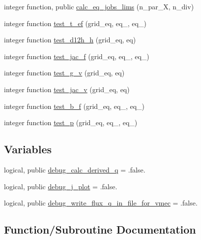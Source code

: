 \begin{DoxyCompactItemize}
\item 
integer function, public \hyperlink{namespaceeq__ops_a4e20b8725fce149449f83754244dc84e}{calc\+\_\+eq\+\_\+jobs\+\_\+lims} (n\+\_\+par\+\_\+X, n\+\_\+div)
\item 
integer function \hyperlink{namespaceeq__ops_a1f5049c3e309fa23ee46fd116c9344f1}{test\+\_\+t\+\_\+ef} (grid\+\_\+eq, eq\+\_, eq\+\_)
\item 
integer function \hyperlink{namespaceeq__ops_a003df1e1ab90dc6f586c3eed3dd067e8}{test\+\_\+d12h\+\_\+h} (grid\+\_\+eq, eq)
\item 
integer function \hyperlink{namespaceeq__ops_a05dcd4803b9c7845d3353614c9630c23}{test\+\_\+jac\+\_\+f} (grid\+\_\+eq, eq\+\_, eq\+\_)
\item 
integer function \hyperlink{namespaceeq__ops_a9811c83477d9d85f7401fd7957a590fc}{test\+\_\+g\+\_\+v} (grid\+\_\+eq, eq)
\item 
integer function \hyperlink{namespaceeq__ops_aef40d04e93f6a96576f8fe893fb086f8}{test\+\_\+jac\+\_\+v} (grid\+\_\+eq, eq)
\item 
integer function \hyperlink{namespaceeq__ops_a8082c12510696bd8ffdd0deef41860c2}{test\+\_\+b\+\_\+f} (grid\+\_\+eq, eq\+\_, eq\+\_)
\item 
integer function \hyperlink{namespaceeq__ops_a38b723f6ed5d2e2772c9c3ad14d5ffd4}{test\+\_\+p} (grid\+\_\+eq, eq\+\_, eq\+\_)
\end{DoxyCompactItemize}
\subsection*{Variables}
\begin{DoxyCompactItemize}
\item 
logical, public \hyperlink{namespaceeq__ops_a1b6609a8d8b427d9133bf323e732f209}{debug\+\_\+calc\+\_\+derived\+\_\+q} = .false.
\item 
logical, public \hyperlink{namespaceeq__ops_a45ba7f46fd439bbd73edfd1fd548b58e}{debug\+\_\+j\+\_\+plot} = .false.
\item 
logical, public \hyperlink{namespaceeq__ops_adf0e2b602c58383d648a2543a17189c9}{debug\+\_\+write\+\_\+flux\+\_\+q\+\_\+in\+\_\+file\+\_\+for\+\_\+vmec} = .false.
\end{DoxyCompactItemize}


\subsection{Function/\+Subroutine Documentation}
\mbox{\label{namespaceeq__ops_a9dab060a0bbbbaf6c8ccb66e1f5f160b}} 
